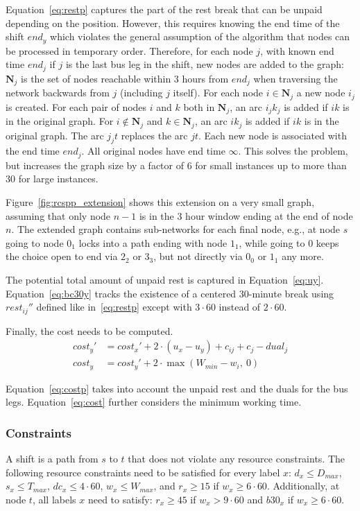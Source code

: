 \documentclass[]{amsart}
\theoremstyle{plain}
\begin{document}
Equation~\eqref{eq:restp} captures the part of the rest break that can be unpaid depending on the position. However, this requires knowing the end time of the shift $\mathit{end}_y$ which violates the general assumption of the algorithm that nodes can be processed in temporary order. Therefore, for each node $j$, with known end time $\mathit{end}_j$ if $j$ is the last bus leg in the shift, new nodes are added to the graph: $\mathbf{N}_j$ is the set of nodes reachable within 3 hours from $\mathit{end}_j$ when traversing the network backwards from $j$ (including $j$ itself). For each node $i\in\mathbf{N}_j$ a new node $i_j$ is created. For each pair of nodes $i$ and $k$ both in $\mathbf{N}_j$, an arc $i_jk_j$ is added if $ik$ is in the original graph. For $i\not\in\mathbf{N}_j$ and $k\in\mathbf{N}_j$, an arc $ik_j$ is added if $ik$ is in the original graph. The arc $j_jt$ replaces the arc $jt$. Each new node is associated with the end time $\mathit{end}_j$. All original nodes have end time $\mathit{\infty}$. This solves the problem, but increases the graph size by a factor of 6 for small instances up to more than 30 for large instances.

Figure~\ref{fig:rcspp_extension} shows this extension on a very small graph, assuming that only node $n-1$ is in the 3 hour window ending at the end of node $n$. The extended graph contains sub-networks for each final node, e.g., at node $s$ going to node $0_1$ locks into a path ending with node $1_1$, while going to $0$ keeps the choice open to end via $2_2$ or $3_3$, but not directly via $0_0$ or $1_1$ any more.

The potential total amount of unpaid rest is captured in Equation~\eqref{eq:uy}. Equation~\eqref{eq:bc30y} tracks the existence of a centered 30-minute break using $\mathit{rest}_{ij}''$ defined like in~\eqref{eq:restp} except with $3\cdot60$ instead of $2\cdot60$.

Finally, the cost needs to be computed.
\begin{align}
    \label{eq:costp}
    \mathit{cost}_y' &= \mathit{cost}_x'+2\cdot(u_x-u_y)+c_{ij}+c_j-\mathit{dual}_j\\
    \label{eq:cost}
    \mathit{cost}_y &= \mathit{cost}_y'+2\cdot\max(W_{min}-w_i,~0)
\end{align}

\noindent
Equation~\eqref{eq:costp} takes into account the unpaid rest and the duals for the bus legs. Equation~\eqref{eq:cost} further considers the minimum working time.

\subsubsection{Constraints}
A shift is a path from $s$ to $t$ that does not violate any resource constraints. The following resource constraints need to be satisfied for every label $x$: $d_x\leq D_{max}$, $s_x\leq T_{max}$, $\mathit{dc}_x\leq4\cdot60$, $w_x\leq W_{max}$, and $r_x\geq15$ if $w_x\geq6\cdot60$. Additionally, at node $t$, all labels $x$ need to satisfy: $r_x\geq45$ if $w_x>9\cdot60$ and $\mathit{b30}_x$ if $w_x\geq6\cdot60$.
\end{document}
